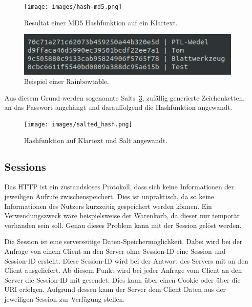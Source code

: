 \documentclass[paper=a4,fontsize=12pt,parskip=half]{scrartcl}
\begin{document}
	\begin{figure}[h]
		\texttt{[image: images/hash-md5.png]}
		\caption{Resultat einer MD5 Hashfunktion auf ein Klartext.}
		\label{fig:md5}
	\end{figure}

	\begin{figure}[h]
		\includegraphics[width=\textwidth]{images/rainbowtable.png}
		\caption{Beispiel einer Rainbowtable.}
		\label{fig:rainbowtable}
	\end{figure}

	Aus diesem Grund werden sogenannte Salts~\ref{fig:salted-hash}, zufällig generierte Zeichenketten, an das Passwort angehängt und darauffolgend die Hashfunktion angewandt.


	\begin{figure}[h]
		\texttt{[image: images/salted\_hash.png]}
		\caption{Hashfunktion auf Klartext und Salt angewandt.}
		\label{fig:salted-hash}
	\end{figure}

	\subsection{Sessions}
	\label{sec: sessions}

	Das \gls{HTTP} ist ein zustandsloses Protokoll, dass sich keine Informationen der jeweiligen Aufrufe zwischenspeichert. Dies ist unpraktisch, da so keine Informationen des Nutzers kurzzeitig gespeichert werden können. Ein Verwendungszweck wäre beispielsweise der Warenkorb, da dieser nur temporär vorhanden sein soll. Genau dieses Problem kann mit der Session gelöst werden.

	Die Session ist eine serverseitige Daten-Speichermöglichkeit. Dabei wird bei der Anfrage von einem Client an den Server ohne Session-ID eine Session und Session-ID erstellt. Diese Session-ID wird bei der Antwort des Servers mit an den Client ausgeliefert. Ab diesem Punkt wird bei jeder Anfrage vom Client an den Server die Session-ID mit gesendet. Dies kann über einen Cookie oder über die \gls{URI} erfolgen. Aufgrund dessen kann der Server dem Client Daten aus der jeweiligen Session zur Verfügung stellen.
\end{document}
